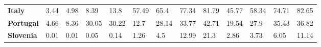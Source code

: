 \begin{table}[H]
{\begin{tabular}{lllllllllllll}
            \textbf{Italy}                                     &
            3.44                                               &
            4.98                                               &
            8.39                                               &
            13.8                                               &
            57.49                                              &
            65.4                                               &
            77.34                                              &
            81.79                                              &
            45.77                                              &
            58.34                                              &
            74.71                                              &
            82.65                                                \\
            \textbf{Portugal}                                  &
            4.66                                               &
            8.36                                               &
            30.05                                              &
            30.22                                              &
            12.7                                               &
            28.14                                              &
            33.77                                              &
            42.71                                              &
            19.54                                              &
            27.9                                               &
            35.43                                              &
            36.82                                                \\
            \textbf{Slovenia}                                  &
            0.01                                               &
            0.01                                               &
            0.05                                               &
            0.14                                               &
            1.26                                               &
            4.5                                                &
            12.99                                              &
            21.3                                               &
            2.86                                               &
            3.73                                               &
            6.05                                               &
            11.14                                                \\

\end{tabular}}
\end{table}
